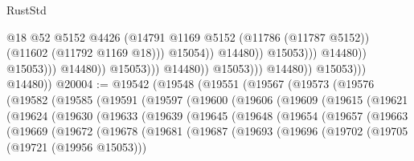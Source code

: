 \begin{lexlean}{RustStd}
\begin{coremodule}
                                                              @18
                                                              @52
                                                              @5152
                                                              @4426
                                                              (@14791
                                                                @1169
                                                                @5152
                                                                (@11786 (@11787 @5152))
                                                                (@11602 (@11792 @1169 @18)))
                                                              @15054))
                                                          @14480))
                                                      @15053)))
                                                @14480))
                                            @15053)))
                                      @14480))
                                  @15053)))
                            @14480))
                        @15053)))
                  @14480))
              @15053)))
        @14480))
@20004 := @19542
    (@19548
      (@19551
        (@19567
          (@19573
            (@19576
              (@19582
                (@19585
                  (@19591
                    (@19597
                      (@19600
                        (@19606
                          (@19609
                            (@19615
                              (@19621
                                (@19624
                                  (@19630
                                    (@19633
                                      (@19639
                                        (@19645
                                          (@19648
                                            (@19654
                                              (@19657
                                                (@19663
                                                  (@19669
                                                    (@19672
                                                      (@19678
                                                        (@19681
                                                          (@19687
                                                            (@19693
                                                              (@19696
                                                                (@19702
                                                                  (@19705 (@19721 (@19956 @15053)))

\end{coremodule}
\end{lexlean}
